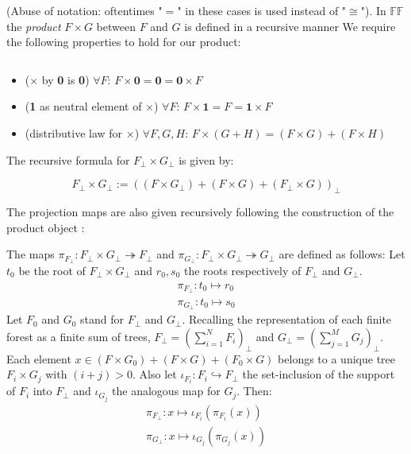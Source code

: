 (Abuse of notation: oftentimes "$=$" in these cases is used instead of "$\cong$"). \newline
In $\mathbb{FF}$ the \emph{product} $F \times G$ between $F$ and $G$ is defined in a recursive manner \newline
We require the following properties to hold for our product:
\begin{lem} ${}$
	\begin{itemize}
		\item ($\times$ by \textbf{0} is \textbf{0}) $\forall F$: $F \times \textbf{0} = \textbf{0} = \textbf{0} \times F$  
		\item (\textbf{1} as neutral element of $\times$) $\forall F$: $F \times \textbf{1} = F = \textbf{1} \times F$
		\item (distributive law for $\times$) $\forall F,G,H $: $ F \times (G+H) = (F \times G) + (F \times H) $
	\end{itemize}
\end{lem}
The recursive formula for $F_{\bot} \times G_{\bot} $ is given by:
\begin{definition}[Product]
	\begin{equation}
		F_{\bot} \times G_{\bot} := ( (F \times G_{\bot}) + ( F \times G ) + (F_{\bot} \times G) )_{\bot}
	\end{equation}
\end{definition}
 The projection maps are also given recursively following the construction of the product object :
 	\begin{definition}[Projections]
 		The maps $ \pi_{F_\bot} : 	F_{\bot} \times G_{\bot} \twoheadrightarrow F_{\bot}$ and $\pi_{G_\bot} : F_{\bot} \times G_{\bot} \twoheadrightarrow G_{\bot} $ are defined as follows:
 		\newline
 		Let $t_0$ be the root of $F_{\bot} \times G_{\bot}$ and $r_0,s_0$ the roots respectively of $F_{\bot}$ and $G_{\bot}$.
 		\begin{gather*}
 			\pi_{F_\bot}: t_0 \mapsto r_0 \\
 			\pi_{G_\bot} : t_0 \mapsto s_0 
 		\end{gather*}
 		Let $F_0$ and $G_0$ stand for $F_\bot$ and $G_\bot$. \newline 
 		Recalling the representation of each finite forest as a finite sum of trees, $F_\bot = (\sum_{i=1}^{N} F_i)_\bot$ and $G_\bot = (\sum_{j=1}^{M} G_j)_\bot$.\newline
 		Each element $x \in  (F \times G_0) + ( F \times G ) + (F_0 \times G) $ belongs to a unique tree $F_i \times G_j$ with $(i+j) >0$.\newline
 		Also let $\iota_{F_i} : F_i \hookrightarrow F_\bot$ the set-inclusion of the support of $F_i$ into $F_\bot$  and $\iota_{G_j}$ the analogous map for $G_j$. Then:
 		\begin{gather*}
 			\pi_{F_\bot}: x \mapsto \iota_{F_i} ( \pi_{F_i}(x) ) \\
 			\pi_{G_\bot}: x \mapsto \iota_{G_j} ( \pi_{G_j}(x) ) 
 		\end{gather*}
 	\end{definition}
 	
